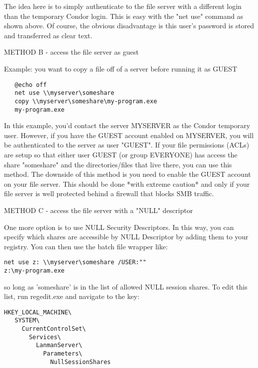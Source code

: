 The idea here is to simply authenticate to the file server with a different 
login than the temporary Condor login.  This is easy with the "net use" 
command as shown above.  Of course, the obvious disadvantage is this user's 
password is stored and transferred as clear text.

METHOD B - access the file server as guest

Example: you want to copy a file off of a server before running it as GUEST

\begin{verbatim}
   @echo off
   net use \\myserver\someshare
   copy \\myserver\someshare\my-program.exe
   my-program.exe
\end{verbatim}

In this example, you'd contact the server MYSERVER as the Condor temporary 
user.  However, if you have the GUEST account enabled on MYSERVER, you will 
be authenticated to the server as user "GUEST".  If your file permissions 
(ACLs) are setup so that either user GUEST (or group EVERYONE) has access 
the share "someshare" and the directories/files that live there, you can 
use this method.  The downside of this method is you need to enable the 
GUEST account on your file server.   \Warn This should be done *with 
extreme caution* and only if your file server is well protected behind a 
firewall that blocks SMB traffic.

METHOD C - access the file server with a "NULL" descriptor

One more option is to use NULL Security Descriptors.  In this way, you
can specify which shares are accessible by NULL Descriptor by adding
them to your registry.  You can then use the batch file wrapper like:

\begin{verbatim}
net use z: \\myserver\someshare /USER:""
z:\my-program.exe
\end{verbatim}

so long as 'someshare' is in the list of allowed NULL session shares.  To
edit this list, run regedit.exe and navigate to the key:

\begin{verbatim}
HKEY_LOCAL_MACHINE\
   SYSTEM\
     CurrentControlSet\
       Services\
         LanmanServer\
           Parameters\
             NullSessionShares
\end{verbatim}

